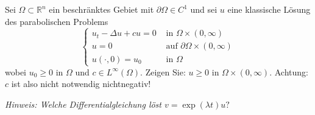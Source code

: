 
\begin{exercise}

Sei $\Omega \subset \mathbb{R}^{n}$ ein beschränktes Gebiet mit $\partial \Omega \in C^{1}$ und sei $u$ eine klassische Lösung des parabolischen Problems
$$
\left\{\begin{array}{ll}
u_{t}-\Delta u+c u=0 & \text { in } \Omega \times(0, \infty) \\
u=0 & \text { auf } \partial \Omega \times(0, \infty) \\
u(\cdot, 0)=u_{0} & \text { in } \Omega
\end{array}\right.
$$
wobei $u_{0} \geq 0$ in $\Omega$ und $c \in L^{\infty}(\Omega) .$ Zeigen Sie: $u \geq 0$ in $\Omega \times(0, \infty) .$ Achtung: $c$ ist also nicht notwendig nichtnegativ!

\textit{Hinweis: Welche Differentialgleichung löst $v=\exp (\lambda t) u ?$}

\end{exercise}


